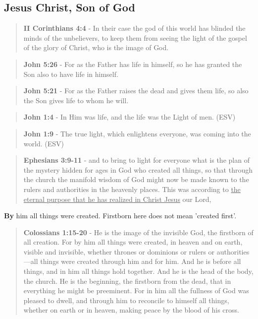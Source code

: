 \documentclass[11pt]{article}
\begin{document}
\subsection{Jesus Christ, Son of God}
\label{sec:org67b2a82}
\begin{quote}
\textbf{II Corinthians 4:4} - In their case the god of this world has blinded the minds of the unbelievers, to keep them from seeing the light of the gospel of the glory of Christ, who is the image of God.
\end{quote}

\begin{quote}
\textbf{John 5:26} - For as the Father has life in himself, so he has granted the Son also to have life in himself.
\end{quote}

\begin{quote}
\textbf{John 5:21} - For as the Father raises the dead and gives them life, so also the Son gives life to whom he will.
\end{quote}

\begin{quote}
\textbf{John 1:4} - In Him was life, and the life was the Light of men. (ESV)
\end{quote}

\begin{quote}
\textbf{John 1:9} - The true light, which enlightens everyone, was coming into the world. (ESV)
\end{quote}

\begin{quote}
\textbf{Ephesians 3:9-11} - and to bring to light for everyone what is the plan of the mystery hidden for ages in God who created all things, so that through the church the manifold wisdom of God might now be made known to the rulers and authorities in the heavenly places. This was according to \uline{the eternal purpose that he has realized in Christ Jesus} our Lord,
\end{quote}

\textbf{By} him all things were created. Firstborn here does not mean 'created first'.

\begin{quote}
\textbf{Colossians 1:15-20} - He is the image of the invisible God, the firstborn of all creation. For by him all things were created, in heaven and on earth, visible and invisible, whether thrones or dominions or rulers or authorities—all things were created through him and for him. And he is before all things, and in him all things hold together. And he is the head of the body, the church. He is the beginning, the firstborn from the dead, that in everything he might be preeminent. For in him all the fullness of God was pleased to dwell, and through him to reconcile to himself all things, whether on earth or in heaven, making peace by the blood of his cross.
\end{quote}
\end{document}
